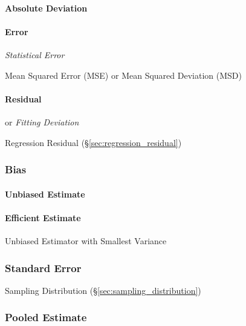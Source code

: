 \paragraph{Absolute Deviation}\label{sec:absolute_deviation}\hfill

\paragraph{Error}\label{sec:error}\hfill

\emph{Statistical Error}

Mean Squared Error (MSE) or Mean Squared Deviation (MSD)



\paragraph{Residual}\label{sec:residual}\hfill

or \emph{Fitting Deviation}

\fist Regression Residual (\S\ref{sec:regression_residual})



\subsubsection{Bias}\label{sec:bias}

\paragraph{Unbiased Estimate}\label{sec:unbiased_estimate}\hfill

\paragraph{Efficient Estimate}\label{sec:efficient_estimate}\hfill

Unbiased Estimator with Smallest Variance



\subsubsection{Standard Error}\label{sec:standard_error}

Sampling Distribution (\S\ref{sec:sampling_distribution})



\subsubsection{Pooled Estimate}\label{sec:pooled_estimate}

